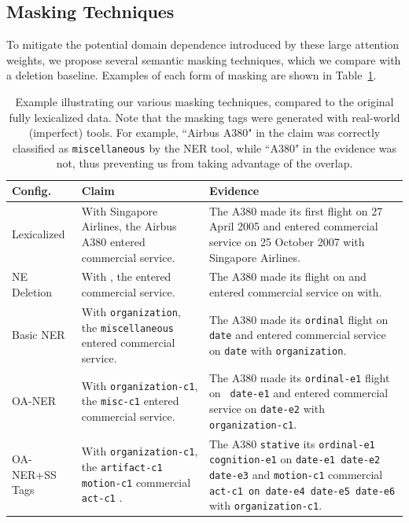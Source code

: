 \subsection{Masking Techniques}\label{masking_techniques}

To mitigate the potential domain dependence introduced by these large attention weights, we propose several semantic masking techniques, which we compare with a deletion baseline.  Examples of each form of masking are shown in Table~\ref{masking_examples}.


\begin{table}[t]
\begin{center}
\begin{tabular}{p{20mm}|p{55mm}|p{70mm}}

\textbf{Config.} & \textbf{Claim}& \textbf{Evidence} \\ \hline
Lexicalized & {With Singapore Airlines, the Airbus A380 entered commercial service.} & {The A380 made its first flight on 27 April 2005 and entered commercial service on 25 October 2007 with Singapore Airlines.}\\
\hline
NE Deletion & {With  , the  entered commercial service.} & {The A380 made its  flight on  and entered commercial service on  with.}\\
\hline
Basic NER  & {With \texttt{organization}, the \texttt{miscellaneous} entered commercial service.} & {The A380 made its \texttt{ordinal} flight on \texttt{date} and entered commercial service on \texttt{date} with \texttt{organization}.}\\
\hline
OA-NER  & {With \texttt{organization-c1}, the \texttt{misc-c1} entered commercial service.} & {The A380 made its \texttt{ordinal-e1} flight on \texttt{ date-e1} and entered commercial service on \texttt{date-e2} with \texttt{organization-c1}.}\\
\hline

\mbox{OA-NER+SS} Tags & {With \texttt{organization-c1}, the \texttt{artifact-c1} \texttt{motion-c1} commercial \texttt{act-c1} .} & {The A380 \texttt{stative} its \texttt{ordinal-e1 cognition-e1} on \texttt{date-e1 date-e2 date-e3} and \texttt{motion-c1} commercial \texttt{act-c1 on date-e4 date-e5 date-e6} with \texttt{organization-c1}.
}\\

\end{tabular}
\end{center}

    \caption{ Example illustrating our various masking techniques, compared to the original fully lexicalized data. Note that the masking tags were generated with real-world (imperfect) tools. For example, ``Airbus A380" in the claim was correctly classified as \texttt{miscellaneous} by the NER tool, while ``A380" in the evidence was not, thus preventing us from taking advantage of the overlap. }
    \label{masking_examples}
\end{table}

